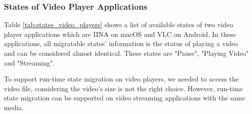 \subsubsection{States of Video Player Applications}
Table \ref{tab:states_video_players} shows a list of available states of two video player applications which are IINA on macOS and VLC on Android. In these applications, all migratable states' information is the status of playing a video and can be considered almost identical. These states are "Pause", "Playing Video" and "Streaming". 

To support run-time state migration on video players, we needed to access the video file, considering the video's size is not the right choice. However, run-time state migration can be supported on video streaming applications with the same media.


